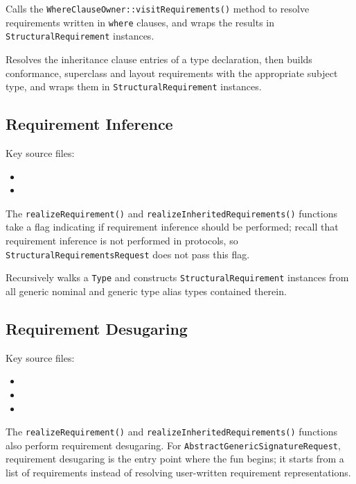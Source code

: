 \documentclass[../generics]{subfiles}
\begin{document}
Calls the \texttt{WhereClauseOwner::visitRequirements()} method to resolve requirements written in \texttt{where} clauses, and wraps the results in \texttt{StructuralRequirement} instances.

Resolves the inheritance clause entries of a type declaration, then builds conformance, superclass and layout requirements with the appropriate subject type, and wraps them in \texttt{StructuralRequirement} instances.

\subsection*{Requirement Inference}

Key source files:
\begin{itemize}
\item {}
\item {}
\end{itemize}
The \texttt{realizeRequirement()} and \texttt{realizeInheritedRequirements()} functions take a flag indicating if requirement inference should be performed; recall that requirement inference is not performed in protocols, so \texttt{StructuralRequirementsRequest} does not pass this flag.

Recursively walks a \texttt{Type} and constructs \texttt{StructuralRequirement} instances from all generic nominal and generic type alias types contained therein.

\subsection*{Requirement Desugaring}

Key source files:
\begin{itemize}
\item {}
\item {}
\item {}
\end{itemize}

The \texttt{realizeRequirement()} and \texttt{realizeInheritedRequirements()} functions also perform requirement desugaring. For \texttt{AbstractGenericSignatureRequest}, requirement desugaring is the entry point where the fun begins; it starts from a list of requirements instead of resolving user-written requirement representations.
\end{document}
